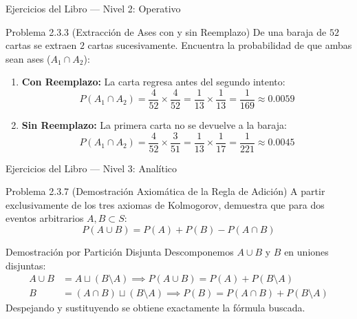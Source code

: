 \begin{frame}{Ejercicios del Libro — Nivel 2: Operativo}
  \small
  \begin{block}{Problema 2.3.3 (Extracción de Ases con y sin Reemplazo)}
    De una baraja de $52$ cartas se extraen $2$ cartas sucesivamente. Encuentra la probabilidad de que ambas sean ases ($A_1 \cap A_2$):
  \end{block}
  
  \vspace{0.2em}
  \pause
  \begin{enumerate}
    \item \textbf{Con Reemplazo:} La carta regresa antes del segundo intento:
    $$P(A_1 \cap A_2) = \frac{4}{52} \times \frac{4}{52} = \frac{1}{13} \times \frac{1}{13} = \frac{1}{169} \approx 0.0059$$ \pause
    \item \textbf{Sin Reemplazo:} La primera carta no se devuelve a la baraja:
    $$P(A_1 \cap A_2) = \frac{4}{52} \times \frac{3}{51} = \frac{1}{13} \times \frac{1}{17} = \frac{1}{221} \approx 0.0045$$
  \end{enumerate}
\end{frame}

\begin{frame}{Ejercicios del Libro — Nivel 3: Analítico}
  \small
  \begin{block}{Problema 2.3.7 (Demostración Axiomática de la Regla de Adición)}
    A partir exclusivamente de los tres axiomas de Kolmogorov, demuestra que para dos eventos arbitrarios $A, B \subset S$:
    $$P(A \cup B) = P(A) + P(B) - P(A \cap B)$$
  \end{block}

  \vspace{0.2em}
  \pause
  \begin{alertblock}{Demostración por Partición Disjunta}
    Descomponemos $A \cup B$ y $B$ en uniones disjuntas:
    \begin{align*}
      A \cup B &= A \sqcup (B \setminus A) \implies P(A \cup B) = P(A) + P(B \setminus A) \\
             B &= (A \cap B) \sqcup (B \setminus A) \implies P(B) = P(A \cap B) + P(B \setminus A)
    \end{align*}
    Despejando y sustituyendo se obtiene exactamente la fórmula buscada.
  \end{alertblock}
\end{frame}

